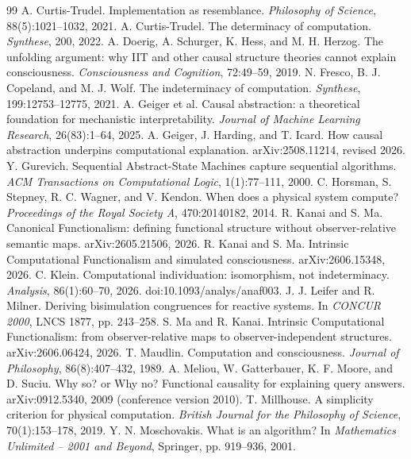 \documentclass[11pt,a4paper]{article}
\begin{document}
\begin{thebibliography}{99}
 A. Curtis-Trudel. Implementation as resemblance. \emph{Philosophy of Science}, 88(5):1021--1032, 2021.
 A. Curtis-Trudel. The determinacy of computation. \emph{Synthese}, 200, 2022.
 A. Doerig, A. Schurger, K. Hess, and M. H. Herzog. The unfolding argument: why IIT and other causal structure theories cannot explain consciousness. \emph{Consciousness and Cognition}, 72:49--59, 2019.
 N. Fresco, B. J. Copeland, and M. J. Wolf. The indeterminacy of computation. \emph{Synthese}, 199:12753--12775, 2021.
 A. Geiger et al. Causal abstraction: a theoretical foundation for mechanistic interpretability. \emph{Journal of Machine Learning Research}, 26(83):1--64, 2025.
 A. Geiger, J. Harding, and T. Icard. How causal abstraction underpins computational explanation. arXiv:2508.11214, revised 2026.
 Y. Gurevich. Sequential Abstract-State Machines capture sequential algorithms. \emph{ACM Transactions on Computational Logic}, 1(1):77--111, 2000.
 C. Horsman, S. Stepney, R. C. Wagner, and V. Kendon. When does a physical system compute? \emph{Proceedings of the Royal Society A}, 470:20140182, 2014.
 R. Kanai and S. Ma. Canonical Functionalism: defining functional structure without observer-relative semantic maps. arXiv:2605.21506, 2026.
 R. Kanai and S. Ma. Intrinsic Computational Functionalism and simulated consciousness. arXiv:2606.15348, 2026.
 C. Klein. Computational individuation: isomorphism, not indeterminacy. \emph{Analysis}, 86(1):60--70, 2026. doi:10.1093/analys/anaf003.
 J. J. Leifer and R. Milner. Deriving bisimulation congruences for reactive systems. In \emph{CONCUR 2000}, LNCS 1877, pp. 243--258.
 S. Ma and R. Kanai. Intrinsic Computational Functionalism: from observer-relative maps to observer-independent structures. arXiv:2606.06424, 2026.
 T. Maudlin. Computation and consciousness. \emph{Journal of Philosophy}, 86(8):407--432, 1989.
 A. Meliou, W. Gatterbauer, K. F. Moore, and D. Suciu. Why so? or Why no? Functional causality for explaining query answers. arXiv:0912.5340, 2009 (conference version 2010).
 T. Millhouse. A simplicity criterion for physical computation. \emph{British Journal for the Philosophy of Science}, 70(1):153--178, 2019.
 Y. N. Moschovakis. What is an algorithm? In \emph{Mathematics Unlimited -- 2001 and Beyond}, Springer, pp. 919--936, 2001.

\end{thebibliography}
\end{document}
